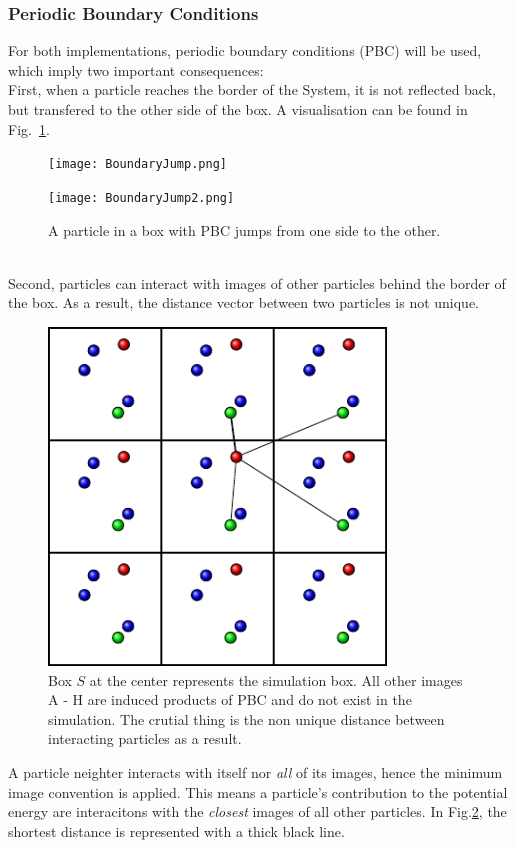 \subsubsection*{Periodic Boundary Conditions}
For both implementations, periodic boundary conditions (PBC) will be used, which imply two important consequences: \smallskip\\
First, when a particle reaches the border of the System, it is not reflected back, but transfered to the other side of the box.
A visualisation can be found in Fig.~\ref{Fig:PBCJump}.
\begin{figure}[h!]
\centering
\begin{minipage}[c]{\textwidth}
\begin{minipage}[c]{0.475\textwidth}
	\texttt{[image: BoundaryJump.png]}
\end{minipage}
\begin{minipage}[c]{0.475\textwidth}
	\texttt{[image: BoundaryJump2.png]}
\end{minipage}
\end{minipage}
\caption[PBC: Jump Case]{A particle in a box with PBC jumps from one side to the other.}
\label{Fig:PBCJump}
\end{figure}\\
Second, particles can interact with images of other particles behind the border of the box. As a result, the distance vector between two particles is not unique.
\begin{figure}[h!]
\centering
\includegraphics[width=0.8\textwidth]{Figures/tikz/MinimalDistance.pdf}
\caption[PBC: Interaction Case]{Box $S$ at the center represents the simulation box.
All other images A - H are induced products of PBC and do not exist in the simulation.
The crutial thing is the non unique distance between interacting particles as a result.}
\label{PBCinteraction}
\end{figure}
A particle neighter interacts with itself nor {\em all} of its images, hence the minimum image convention is applied.
This means a particle's contribution to the potential energy are interacitons with the {\em closest} images of all other particles.
In Fig.\ref{PBCinteraction}, the shortest distance is represented with a thick black line.





